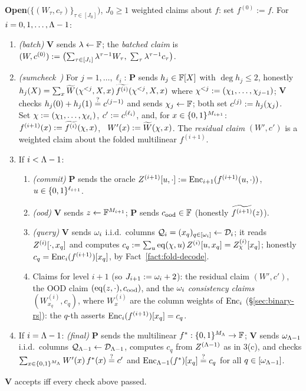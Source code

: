 \begin{protocol}
\smallskip
\textbf{Open}$\bigl(\{(W_\tau, c_\tau)\}_{\tau \in [J_0]}\bigr)$, $J_0 \ge 1$ weighted claims about $f$: set $f^{(0)} := f$. For $i = 0, 1, \dots, \Lambda - 1$:
\begin{enumerate}[itemsep=0.5pt,topsep=2pt]
\item \emph{(batch)} $\mathbf{V}$ sends $\lambda \leftarrow \mathbb{F}$; the \emph{batched claim} is $(W, c^{(0)}) := \bigl(\sum_{\tau \in [J_i]} \lambda^{\tau-1} W_\tau,\; \sum_{\tau} \lambda^{\tau-1} c_\tau\bigr)$.
\item \emph{(sumcheck~\cite{LFKN92})} For $j = 1, \dots, \ell_i$: $\mathbf{P}$ sends $h_j \in \mathbb{F}[X]$ with $\deg h_j \le 2$, honestly $h_j(X) = \sum_{x} \widetilde{W}(\chi^{<j}, X, x)\, \widetilde{f^{(i)}}(\chi^{<j}, X, x)$ where $\chi^{<j} := (\chi_1, \dots, \chi_{j-1})$; $\mathbf{V}$ checks $h_j(0) + h_j(1) \stackrel{?}{=} c^{(j-1)}$ and sends $\chi_j \leftarrow \mathbb{F}$; both set $c^{(j)} := h_j(\chi_j)$.\\
Set $\chi := (\chi_1, \dots, \chi_{\ell_i})$, $c' := c^{(\ell_i)}$, and, for $x \in \{0,1\}^{M_{i+1}}$: \ $f^{(i+1)}(x) := \widetilde{f^{(i)}}(\chi, x)$, \ $W'(x) := \widetilde{W}(\chi, x)$. The \emph{residual claim} $(W', c')$ is a weighted claim about the folded multilinear $f^{(i+1)}$.
\item If $i < \Lambda - 1$:
\begin{enumerate}[itemsep=0.5pt,topsep=1pt,label=(\alph*)]
\item \emph{(commit)} $\mathbf{P}$ sends the oracle $Z^{(i+1)}[u, \cdot] := \mathrm{Enc}_{i+1}(f^{(i+1)}(u, \cdot))$, $u \in \{0,1\}^{\ell_{i+1}}$.
\item \emph{(ood)} $\mathbf{V}$ sends $z \leftarrow \mathbb{F}^{M_{i+1}}$; $\mathbf{P}$ sends $c_{\mathrm{ood}} \in \mathbb{F}$ (honestly $\widetilde{f^{(i+1)}}(z)$).
\item \emph{(query)} $\mathbf{V}$ sends $\omega_i$ i.i.d.\ columns $\mathcal{Q}_i = (x_q)_{q \in [\omega_i]} \leftarrow \mathcal{D}_i$; it reads $Z^{(i)}[\cdot, x_q]$ and computes $c_q := \sum_{u} \operatorname{eq}(\chi, u)\, Z^{(i)}[u, x_q] = Z^{(i)}_\chi[x_q]$; honestly $c_q = \mathrm{Enc}_i(f^{(i+1)})[x_q]$, by Fact~\ref{fact:fold-decode}.
\item Claims for level $i+1$ (so $J_{i+1} := \omega_i + 2$): the residual claim $(W', c')$, the OOD claim $(\operatorname{eq}(z, \cdot), c_{\mathrm{ood}})$, and the $\omega_i$ \emph{consistency claims} $(W^{(i)}_{x_q}, c_q)$, where $W^{(i)}_x$ are the column weights of $\mathrm{Enc}_i$ (\S\ref{sec:binary-rs}): the $q$-th asserts $\mathrm{Enc}_i(f^{(i+1)})[x_q] = c_q$.
\end{enumerate}
\item If $i = \Lambda - 1$: \emph{(final)} $\mathbf{P}$ sends the multilinear $f^{\ast} : \{0,1\}^{M_\Lambda} \to \mathbb{F}$; $\mathbf{V}$ sends $\omega_{\Lambda-1}$ i.i.d.\ columns $\mathcal{Q}_{\Lambda-1} \leftarrow \mathcal{D}_{\Lambda-1}$, computes $c_q$ from $Z^{(\Lambda-1)}$ as in 3(c), and checks $\sum_{x \in \{0,1\}^{M_\Lambda}} W'(x)\, f^{\ast}(x) \stackrel{?}{=} c'$ and $\mathrm{Enc}_{\Lambda-1}(f^{\ast})[x_q] \stackrel{?}{=} c_q$ for all $q \in [\omega_{\Lambda-1}]$.
\end{enumerate}
$\mathbf{V}$ accepts iff every check above passed.
\end{protocol}

